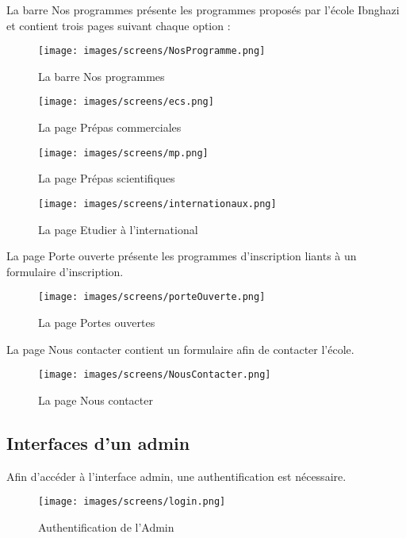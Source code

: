 La barre Nos programmes présente les programmes proposés par l'école Ibnghazi et contient trois pages suivant chaque option :
\begin{figure}[!h]  
\begin{center}
\texttt{[image: images/screens/NosProgramme.png]}
\end{center}
\caption{La barre Nos programmes}
\end{figure}

\begin{figure}[h]
    \begin{minipage}[c]{.46\linewidth}
        \centering
        \texttt{[image: images/screens/ecs.png]}
        \caption{La page Prépas commerciales}
    \end{minipage}
    \hfill%
    \begin{minipage}[c]{.46\linewidth}
        \centering
        \texttt{[image: images/screens/mp.png]}
        \caption{La page Prépas scientifiques}
    \end{minipage}
\end{figure}
\newpage
\begin{figure}[!h]  
\begin{center}
\texttt{[image: images/screens/internationaux.png]}
\end{center}
\caption{La page Etudier à l'international}
\end{figure}

La page Porte ouverte présente les programmes d'inscription liants à un formulaire d'inscription.
\begin{figure}[!h]  
\begin{center}
\texttt{[image: images/screens/porteOuverte.png]}
\end{center}
\caption{La page Portes ouvertes}
\end{figure}
\newpage

La page Nous contacter contient un formulaire afin de contacter l'école.
\begin{figure}[!h]  
\begin{center}
\texttt{[image: images/screens/NousContacter.png]}
\end{center}
\caption{La page Nous contacter}
\end{figure}

\subsection{Interfaces d'un admin}
Afin d'accéder à l'interface admin, une authentification est nécessaire.
\begin{figure}[!h]  
\begin{center}
\texttt{[image: images/screens/login.png]}
\end{center}
\caption{Authentification de l'Admin}
\end{figure}
\newpage

